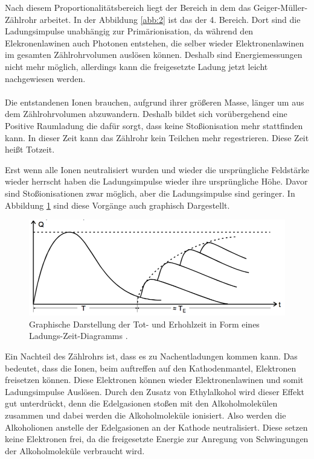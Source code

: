 Nach diesem Proportionalitätsbereich liegt der Bereich in dem das Geiger-Müller-
Zählrohr arbeitet. In der Abbildung \ref{abb:2} ist das der 4. Bereich. Dort sind
die Ladungsimpulse unabhängig zur Primärionisation, da während den Elekronenlawinen
auch Photonen entstehen, die selber wieder Elektronenlawinen im gesamten Zählrohrvolumen
auslösen können. Deshalb sind Energiemessungen nicht mehr möglich, allerdings
kann die freigesetzte Ladung jetzt leicht nachgewiesen werden.\\\\


Die entstandenen Ionen brauchen, aufgrund ihrer größeren Masse, länger um aus dem
Zählrohrvolumen abzuwandern. Deshalb bildet sich vorübergehend eine Positive Raumladung
die dafür sorgt, dass keine Stoßionisation mehr stattfinden kann. In dieser Zeit kann
das Zählrohr kein Teilchen mehr regestrieren. Diese Zeit heißt Totzeit.

Erst wenn alle Ionen neutralisiert wurden und wieder die ursprüngliche Feldstärke wieder
herrscht haben die Ladungsimpulse wieder ihre ursprüngliche Höhe. Davor sind Stoßionisationen
zwar möglich, aber die Ladungsimpulse sind geringer. In Abbildung \ref{abb:3} sind diese
Vorgänge auch graphisch Dargestellt.

\begin{figure}[H]
  \centering
  \includegraphics[width=\textwidth]{content/Totzeit.png}
  \caption{Graphische Darstellung der Tot- und Erhohlzeit in Form eines Ladungs-Zeit-Diagramms
  \cite{1}.}
  \label{abb:3}
\end{figure}

Ein Nachteil des Zählrohrs ist, dass es zu Nachentladungen kommen kann. Das bedeutet,
dass die Ionen, beim auftreffen auf den Kathodenmantel, Elektronen freisetzen können.
Diese Elektronen können wieder Elektronenlawinen und somit Ladungsimpulse Auslösen.
Durch den Zusatz von Ethylalkohol wird dieser Effekt gut unterdrückt, denn die
Edelgasionen stoßen mit den Alkoholmolekülen zusammen und dabei werden die Alkoholmoleküle
ionisiert. Also werden die Alkoholionen anstelle der Edelgasionen an der Kathode neutralisiert.
Diese setzen keine Elektronen frei, da die freigesetzte Energie zur Anregung von Schwingungen
der Alkoholmoleküle verbraucht wird.

